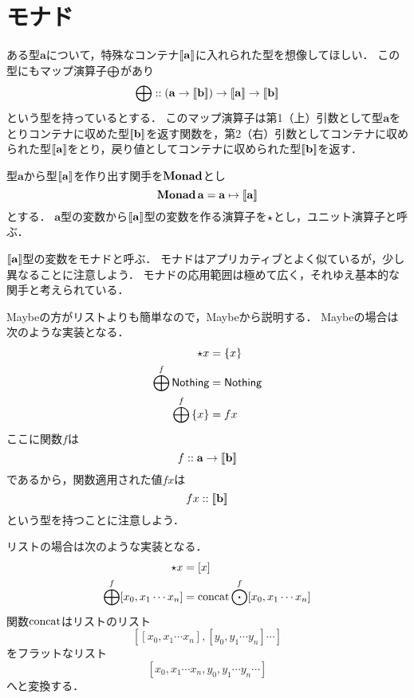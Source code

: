 \documentclass[twocolumn]{jsbook}
\newcommand{\typename}[1]{\mathbf{#1}}
\newcommand{\listtype}[1]{[#1]}
\begin{document}
\section{モナド}

ある型$\typename{a}$について，特殊なコンテナ$\monad{\typename{a}}$に入れられた型を想像してほしい．
この型にもマップ演算子$\bigoplus$があり$$\monadfunc::\left(\typename{a}\rightarrow\monad{\typename{b}}\right)\rightarrow\monad{\typename{a}}\rightarrow{\monad{\typename{b}}}$$という型を持っているとする．
このマップ演算子は第1（上）引数として型$\typename{a}$をとりコンテナに収めた型$\monad{\typename{b}}$を返す関数を，第2（右）引数としてコンテナに収められた型$\monad{\typename{a}}$をとり，戻り値としてコンテナに収められた型$\monad{\typename{b}}$を返す．

型$\typename{a}$から型$\monad{\typename{a}}$を作り出す関手を$\mathop{\mathop{\textbf{Monad}}}$とし$$\monadfunctor\typename{a}=\typename{a}\mapsto\monad{\typename{a}}$$とする．
$\typename{a}$型の変数から$\monad{\typename{a}}$型の変数を作る演算子を$\star$とし，ユニット演算子と呼ぶ．

$\monad{\typename{a}}$型の変数をモナドと呼ぶ．
モナドはアプリカティブとよく似ているが，少し異なることに注意しよう．
モナドの応用範囲は極めて広く，それゆえ基本的な関手と考えられている．

Maybeの方がリストよりも簡単なので，Maybeから説明する．
Maybeの場合は次のような実装となる．
\begin{align*}
\star x&=\left\{x\right\}\\
\bigoplus^f\textsf{Nothing}&=\textsf{Nothing}\\
\bigoplus^f\left\{x\right\}&=fx
\end{align*}
ここに関数$f$は$$f::\typename{a}\rightarrow\monad{\typename{b}}$$であるから，関数適用された値$fx$は$$fx::\monad{\typename{b}}$$という型を持つことに注意しよう．

% 
% 
% 

リストの場合は次のような実装となる．
\begin{align*}
\unit x&=\listtype{x}\\
\monadfunc^f\listtype{x_0,x_1\dotsb x_n}&=\concat\mapfunc^f\listtype{x_0,x_1\dotsb x_n}
\end{align*}
関数$\mathop{\text{concat}}$はリストのリスト$$\listtype{\listtype{x_0,x_1\dotsb x_n},\listtype{y_0,y_1\dotsb y_n}\dotsb}$$をフラットなリスト$$\listtype{x_0,x_1\dotsb x_n,y_0,y_1\dotsb y_n\dotsb}$$へと変換する．
\end{document}
